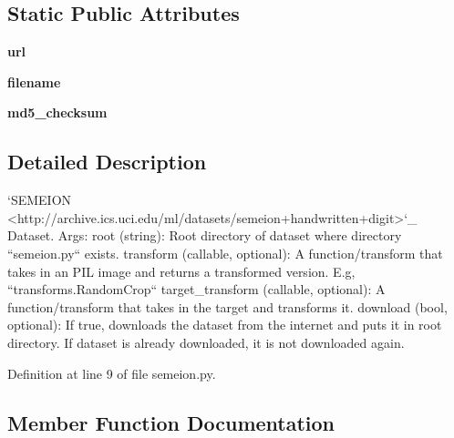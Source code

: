 \subsection*{Static Public Attributes}
\begin{DoxyCompactItemize}
\item 
\mbox{\label{classtorchvision_1_1datasets_1_1semeion_1_1SEMEION_ad135a71a52c85d6c4b93ecf0c39ff925}} 
{\bfseries url}
\item 
\mbox{\label{classtorchvision_1_1datasets_1_1semeion_1_1SEMEION_a01d3b4253b0daa6705eadbc423f99246}} 
{\bfseries filename}
\item 
\mbox{\label{classtorchvision_1_1datasets_1_1semeion_1_1SEMEION_ab6976c9b03496e39fbe70b43cc9fac55}} 
{\bfseries md5\+\_\+checksum}
\end{DoxyCompactItemize}


\subsection{Detailed Description}
\begin{DoxyVerb}`SEMEION <http://archive.ics.uci.edu/ml/datasets/semeion+handwritten+digit>`_ Dataset.
Args:
    root (string): Root directory of dataset where directory
        ``semeion.py`` exists.
    transform (callable, optional): A function/transform that  takes in an PIL image
        and returns a transformed version. E.g, ``transforms.RandomCrop``
    target_transform (callable, optional): A function/transform that takes in the
        target and transforms it.
    download (bool, optional): If true, downloads the dataset from the internet and
        puts it in root directory. If dataset is already downloaded, it is not
        downloaded again.
\end{DoxyVerb}
 

Definition at line 9 of file semeion.\+py.



\subsection{Member Function Documentation}
\mbox{\label{classtorchvision_1_1datasets_1_1semeion_1_1SEMEION_ae6317c79301f796102c2c7fa96c96b3f}} 
